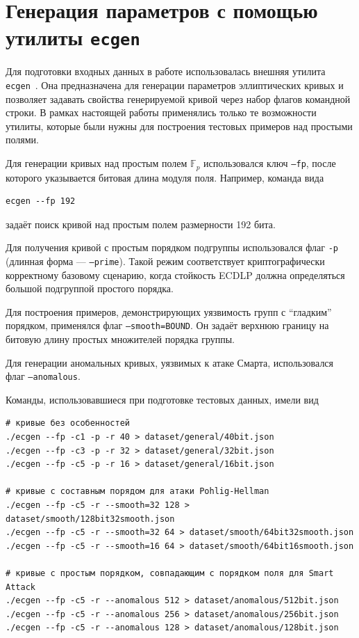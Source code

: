 \section{Генерация параметров с помощью утилиты \texttt{ecgen}}

Для подготовки входных данных в работе использовалась внешняя утилита \texttt{ecgen}~\cite{ecgen}. Она предназначена для генерации параметров эллиптических кривых и позволяет задавать свойства генерируемой кривой через набор флагов командной строки. В рамках настоящей работы применялись только те возможности утилиты, которые были нужны для построения тестовых примеров над простыми полями.

Для генерации кривых над простым полем $\mathbb{F}_p$ использовался ключ \texttt{--fp}, после которого указывается битовая длина модуля поля. Например, команда вида
\begin{verbatim}
ecgen --fp 192
\end{verbatim}
задаёт поиск кривой над простым полем размерности 192 бита.

Для получения кривой с простым порядком подгруппы использовался флаг \texttt{-p} (длинная форма --- \texttt{--prime}). Такой режим соответствует криптографически корректному базовому сценарию, когда стойкость ECDLP должна определяться большой подгруппой простого порядка.

Для построения примеров, демонстрирующих уязвимость групп с ``гладким'' порядком, применялся флаг \texttt{--smooth=BOUND}. Он задаёт верхнюю границу на битовую длину простых множителей порядка группы.

Для генерации аномальных кривых, уязвимых к атаке Смарта, использовался флаг \texttt{--anomalous}.

Команды, использовавшиеся при подготовке тестовых данных, имели вид
\begin{verbatim}
# кривые без особенностей
./ecgen --fp -c1 -p -r 40 > dataset/general/40bit.json
./ecgen --fp -c3 -p -r 32 > dataset/general/32bit.json
./ecgen --fp -c5 -p -r 16 > dataset/general/16bit.json

# кривые с составным порядом для атаки Pohlig-Hellman
./ecgen --fp -c5 -r --smooth=32 128 > dataset/smooth/128bit32smooth.json
./ecgen --fp -c5 -r --smooth=32 64 > dataset/smooth/64bit32smooth.json
./ecgen --fp -c5 -r --smooth=16 64 > dataset/smooth/64bit16smooth.json

# кривые с простым порядком, совпадающим с порядком поля для Smart Attack
./ecgen --fp -c5 -r --anomalous 512 > dataset/anomalous/512bit.json
./ecgen --fp -c5 -r --anomalous 256 > dataset/anomalous/256bit.json
./ecgen --fp -c5 -r --anomalous 128 > dataset/anomalous/128bit.json
\end{verbatim}

